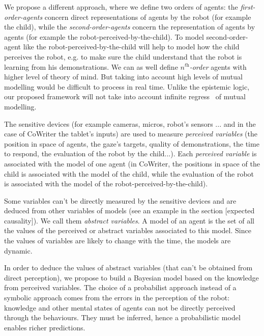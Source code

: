 \documentclass[conference]{IEEEtran}
\begin{document}
We propose a different approach, where we define two orders of agents: the \textit{first-order-agents} concern direct representations of agents by the robot (for example the child), while the \textit{second-order-agents} concern the representation of agents by agents (for example the robot-perceived-by-the-child). 
To model second-order-agent like the robot-perceived-by-the-child will help to model how the child perceives the robot, e.g. to make sure the child understand that the robot is learning from his demonstrations. 
We can as well define \textit{$n^{\textit{th}}$-order} agents with higher level of theory of mind. But taking into account high levels of mutual modelling would be difficult to process in real time. Unlike the epistemic logic, our proposed framework will not take into account infinite regress~\cite{clark1991grounding} of mutual modelling. 

The sensitive devices (for example cameras, micros, robot's sensors ... and in the case of CoWriter the tablet's inputs) are used to measure \textit{perceived variables} (the position in space of agents, the gaze's targets, quality of demonstrations, the time to respond, the evaluation of the robot by the child...). Each \textit{perceived variable} is associated with the model of one agent (in CoWriter, the positions in space of the child is associated with the model of the child, while the evaluation of the robot is associated with the model of the robot-perceived-by-the-child). 

Some variables can't be directly measured by the sensitive devices and are deduced from other variables of models (see an example in the section [expected causality]). We call them \textit{abstract variables}. 
A model of an agent is the set of all the values of the perceived or abstract variables associated to this model. Since the values of variables are likely to change with the time, the models are dynamic.


In order to deduce the values of abstract variables (that can't be obtained from direct perception),
we propose to build a Bayesian model based on the knowledge from perceived variables. 
The choice of a probabilist approach instead of a symbolic approach comes from the errors in the perception of the robot: knowledge and other mental states of agents can not be directly perceived through the behaviours. They must be inferred, hence a probabilistic model enables
richer predictions.
\end{document}

